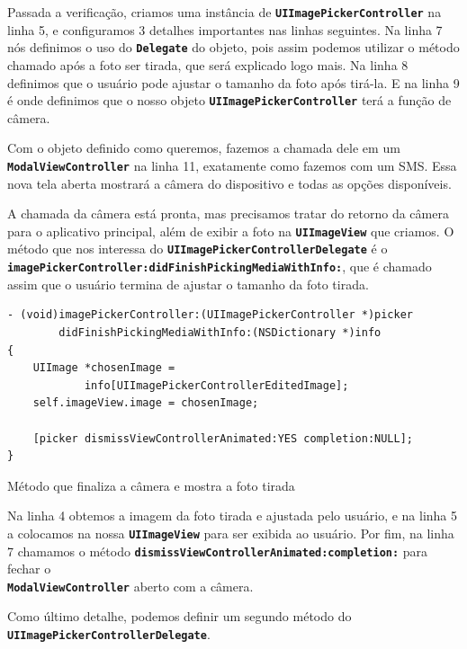 \documentclass[a4paper,12pt,brazil,doubleside]{book}
\begin{document}
\begin{singlespace}
Passada a verificação, criamos uma instância de \texttt{\textbf{UIImagePickerController}} na linha 5, e configuramos 3 detalhes importantes nas linhas seguintes. Na linha 7 nós definimos o uso do \texttt{\textbf{Delegate}} do objeto, pois assim podemos utilizar o método chamado após a foto ser tirada, que será explicado logo mais. Na linha 8 definimos que o usuário pode ajustar o tamanho da foto após tirá-la. E na linha 9 é onde definimos que o nosso objeto \texttt{\textbf{UIImagePickerController}} terá a função de câmera.

Com o objeto definido como queremos, fazemos a chamada dele em um\\ \texttt{\textbf{ModalViewController}} na linha 11, exatamente como fazemos com um SMS. Essa nova tela aberta mostrará a câmera do dispositivo e todas as opções disponíveis.

A chamada da câmera está pronta, mas precisamos tratar do retorno da câmera para o aplicativo principal, além de exibir a foto na \texttt{\textbf{UIImageView}} que criamos. O método que nos interessa do \texttt{\textbf{UIImagePickerControllerDelegate}} é o\\ \texttt{\textbf{imagePickerController:didFinishPickingMediaWithInfo:}}, que é chamado assim que o usuário termina de ajustar o tamanho da foto tirada.

\begin{listing}[H]
\begin{verbatim}
- (void)imagePickerController:(UIImagePickerController *)picker
        didFinishPickingMediaWithInfo:(NSDictionary *)info
{
    UIImage *chosenImage =
            info[UIImagePickerControllerEditedImage];
    self.imageView.image = chosenImage;
    
    [picker dismissViewControllerAnimated:YES completion:NULL];
}
\end{verbatim}
\caption{Método que finaliza a câmera e mostra a foto tirada}
\end{listing}


Na linha 4 obtemos a imagem da foto tirada e ajustada pelo usuário, e na linha 5 a colocamos na nossa \texttt{\textbf{UIImageView}} para ser exibida ao usuário. Por fim, na linha 7 chamamos o método \texttt{\textbf{dismissViewControllerAnimated:completion:}} para fechar o\\ \texttt{\textbf{ModalViewController}} aberto com a câmera.

Como último detalhe, podemos definir um segundo método do\\ \texttt{\textbf{UIImagePickerControllerDelegate}}.


\end{singlespace}
\end{document}

